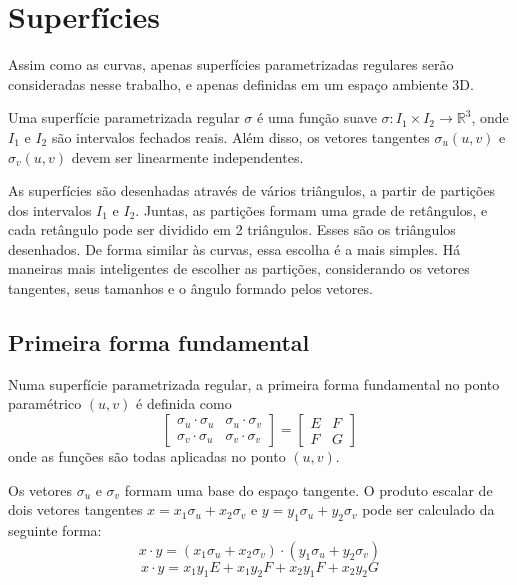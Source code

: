 \section{Superfícies}
Assim como as curvas, apenas superfícies parametrizadas regulares
serão consideradas nesse trabalho, e apenas definidas em um
espaço ambiente 3D.

\begin{defSurfParamReg}
Uma superfície parametrizada regular $\sigma$ é uma função suave
$\sigma :  I_1 \times I_2 \rightarrow \mathbb{R}^3$,
onde $I_1$ e $I_2$ são intervalos fechados reais.
Além disso, os vetores tangentes $\sigma_u(u,v)$ e $\sigma_v(u,v)$
devem ser linearmente independentes.
\end{defSurfParamReg}

As superfícies são desenhadas através de vários triângulos,
a partir de partições dos intervalos $I_1$ e $I_2$.
Juntas, as partições formam uma grade de retângulos, e cada retângulo pode ser dividido em 2 triângulos.
Esses são os triângulos desenhados.
De forma similar às curvas, essa escolha é a mais simples.
Há maneiras mais inteligentes de escolher as partições, considerando os vetores tangentes,
seus tamanhos e o ângulo formado pelos vetores.

\subsection{Primeira forma fundamental}
\begin{defSurfForm}
Numa superfície parametrizada regular,
a primeira forma fundamental no ponto paramétrico $(u,v)$ é definida como
\[
    \left[
        \begin{array}{cc}
            \sigma_u \cdot \sigma_u & \sigma_u \cdot \sigma_v \\
            \sigma_v \cdot \sigma_u & \sigma_v \cdot \sigma_v
        \end{array}
    \right]
    = 
    \left[
        \begin{array}{cc}
            E & F \\
            F & G
        \end{array}
    \right]
\]
onde as funções são todas aplicadas no ponto $(u,v)$.
\end{defSurfForm}

Os vetores $\sigma_u$ e $\sigma_v$ formam uma base do espaço tangente.
O produto escalar de dois vetores tangentes 
$x = x_1 \sigma_u + x_2 \sigma_v$ e $y = y_1 \sigma_u + y_2 \sigma_v$ pode ser calculado da seguinte forma:
\[x\cdot y = (x_1 \sigma_u + x_2 \sigma_v) \cdot (y_1 \sigma_u + y_2 \sigma_v)\]
\[x\cdot y = x_1 y_1 E + x_1 y_2 F + x_2 y_1 F + x_2 y_2 G\]

